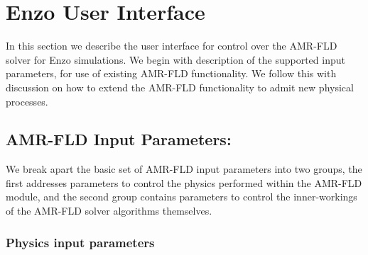 \documentclass[10pt]{article}
\renewcommand{\(}{\left(}
\renewcommand{\)}{\right)}
\begin{document}
\section{Enzo User Interface}
\label{sec:user_interface}

In this section we describe the user interface for control over the
AMR-FLD solver for Enzo simulations.  We begin with description of the
supported input parameters, for use of existing AMR-FLD
functionality.  We follow this with discussion on how to extend the
AMR-FLD functionality to admit new physical processes.


\subsection{AMR-FLD Input Parameters:}
\label{sec:input_parameters}


We break apart the basic set of AMR-FLD input parameters into two
groups, the first addresses parameters to control the physics
performed within the AMR-FLD module, and the second group contains
parameters to control the inner-workings of the AMR-FLD solver
algorithms themselves.


\subsubsection{Physics input parameters}
\label{sec:physics_input_parameters}
\end{document}
